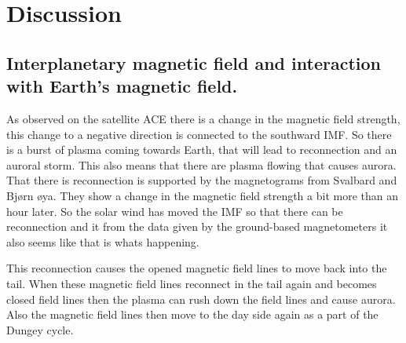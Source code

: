 \chapter{Discussion}
\label{chap:Discussion}

\section{Interplanetary magnetic field and interaction with Earth's magnetic field.}

As observed on the satellite ACE there is a change in the magnetic field strength, this change to a negative direction is connected to the southward IMF. So there is a burst of plasma coming towards Earth, that will lead to reconnection and an auroral storm. This also means that there are plasma flowing that causes aurora. That there is reconnection is supported by the magnetograms from Svalbard and Bj\o rn \o ya. They show a change in the magnetic field strength a bit more than an hour later. So the solar wind has moved the IMF so that there can be reconnection and it from the data given by the ground-based magnetometers it also seems like that is whats happening. 



This reconnection causes the opened magnetic field lines to move back into the tail. When these magnetic field lines reconnect in the tail again and becomes closed field lines then the plasma can rush down the field lines and cause aurora. Also the magnetic field lines then move to the day side again as a part of the Dungey cycle. 
